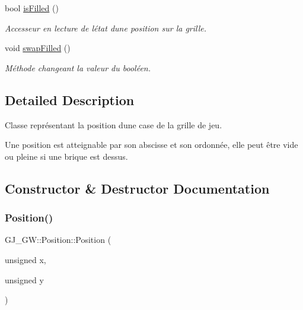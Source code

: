 \begin{DoxyCompactItemize}
bool \hyperlink{class_g_j___g_w_1_1_position_a880608d66230d1628c70ce79939c8df9}{is\+Filled} ()
\begin{DoxyCompactList}\small\item\em Accesseur en lecture de l\textquotesingle{}état d\textquotesingle{}une position sur la grille. \end{DoxyCompactList}\item 
\hypertarget{class_g_j___g_w_1_1_position_a94d7512124fde83c3f0e461ad2514b80}{}\label{class_g_j___g_w_1_1_position_a94d7512124fde83c3f0e461ad2514b80} 
void \hyperlink{class_g_j___g_w_1_1_position_a94d7512124fde83c3f0e461ad2514b80}{swap\+Filled} ()
\begin{DoxyCompactList}\small\item\em Méthode changeant la valeur du booléen. \end{DoxyCompactList}\end{DoxyCompactItemize}


\subsection{Detailed Description}
Classe représentant la position d\textquotesingle{}une case de la grille de jeu. 

Une position est atteignable par son abscisse et son ordonnée, elle peut être vide ou pleine si une brique est dessus. 

\subsection{Constructor \& Destructor Documentation}
\hypertarget{class_g_j___g_w_1_1_position_ab3e634a5c6392113d2b5f6ecc214997a}{}\label{class_g_j___g_w_1_1_position_ab3e634a5c6392113d2b5f6ecc214997a} 
\subsubsection{\texorpdfstring{Position()}{Position()}}
{\footnotesize\ttfamily G\+J\+\_\+\+G\+W\+::\+Position\+::\+Position (\begin{DoxyParamCaption}\item[{unsigned}]{x,  }\item[{unsigned}]{y }\end{DoxyParamCaption})}




